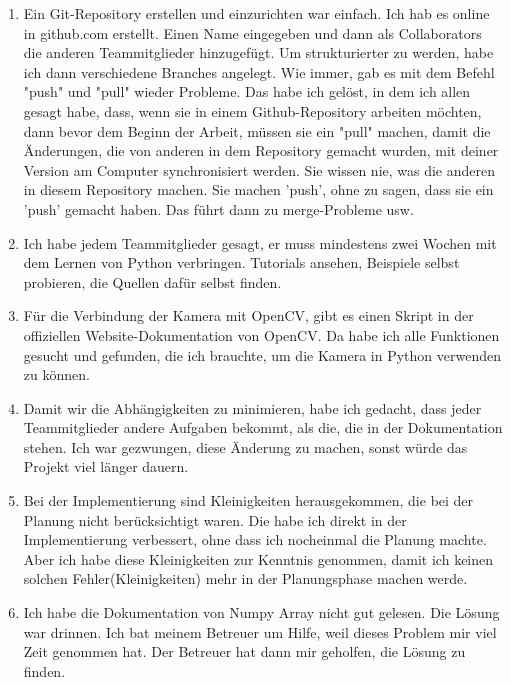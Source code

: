 \begin{itemize}
\begin{enumerate}
	\item Ein Git-Repository erstellen und einzurichten war einfach. Ich hab es online in github.com erstellt. Einen Name eingegeben und dann als Collaborators die anderen Teammitglieder hinzugef\"ugt. Um strukturierter zu werden, habe ich dann verschiedene Branches angelegt. Wie immer, gab es mit dem Befehl "push" und "pull" wieder Probleme. Das habe ich gel\"ost, in dem ich allen gesagt habe, dass, wenn sie in einem Github-Repository arbeiten m\"ochten, dann bevor dem Beginn der Arbeit, m\"ussen sie ein "pull" machen, damit die \"Anderungen, die von anderen in dem Repository gemacht wurden, mit deiner Version am Computer synchronisiert werden. Sie wissen nie, was die anderen in diesem Repository machen. Sie machen 'push', ohne zu sagen, dass sie ein 'push' gemacht haben. Das f\"uhrt dann zu merge-Probleme usw. 
	
	\item Ich habe jedem Teammitglieder gesagt, er muss mindestens zwei Wochen mit dem Lernen von Python verbringen. Tutorials ansehen, Beispiele selbst probieren, die Quellen daf\"ur selbst finden. 
	
	\item  F\"ur die Verbindung der Kamera mit OpenCV, gibt es einen Skript in der offiziellen Website-Dokumentation von OpenCV. Da habe ich alle Funktionen gesucht und gefunden, die ich brauchte, um die Kamera in Python verwenden zu k\"onnen. 
	
	\item Damit wir die Abh\"angigkeiten zu minimieren, habe ich gedacht, dass jeder Teammitglieder andere Aufgaben bekommt, als die, die in der Dokumentation stehen. Ich war gezwungen, diese \"Anderung zu machen, sonst w\"urde das Projekt viel l\"anger dauern. 
	
	\item Bei der Implementierung sind Kleinigkeiten herausgekommen, die bei der Planung nicht ber\"ucksichtigt waren. Die habe ich direkt in der Implementierung verbessert, ohne dass ich nocheinmal die Planung machte. Aber ich habe diese Kleinigkeiten zur Kenntnis genommen, damit ich keinen solchen Fehler(Kleinigkeiten) mehr in der Planungsphase machen werde. 
	
	\item Ich habe die Dokumentation von Numpy Array nicht gut gelesen. Die L\"osung war drinnen. Ich bat meinem Betreuer um Hilfe, weil dieses Problem mir viel Zeit genommen hat. Der Betreuer hat dann mir geholfen, die L\"osung zu finden. 
	

\end{enumerate}
\end{itemize}

